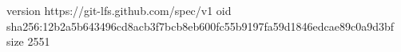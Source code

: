 version https://git-lfs.github.com/spec/v1
oid sha256:12b2a5b643496cd8acb3f7bcb8eb600fc55b9197fa59d1846edcae89c0a9d3bf
size 2551
